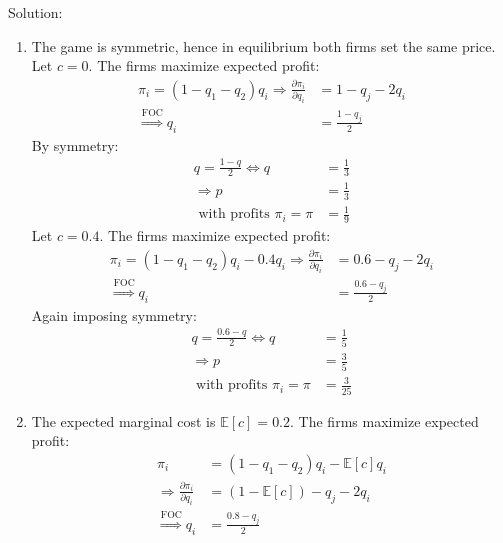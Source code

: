 \documentclass[11pt]{article}
\numberwithin{equation}{section}
\newcommand{\1}[1]{\,I_{#1}} %
\begin{document}
\begin{enumerate}
	      Solution:
	      \begin{enumerate}
		      \item The game is symmetric, hence in equilibrium both firms set the same
		            price. Let $c=0$. The firms maximize expected profit:
		            \begin{align*}
			            \pi_i=(1-q_1-q_2)q_i\Longrightarrow\frac{\partial\pi_i}{\partial q_i} & =1-q_j-2q_i      \\
			            \overset{\text{FOC}}{\Longrightarrow} q_i                             & =\frac{1-q_j}{2}
		            \end{align*}
		            By symmetry:
		            \begin{align*}
			            q=\frac{1-q}{2}\Longleftrightarrow q & =\frac{1}{3} \\
			            \Longrightarrow p                    & =\frac{1}{3} \\
			            \text{ with profits } \pi_i=\pi      & =\frac{1}{9}
		            \end{align*}
		            Let $c=0.4$. The firms maximize expected profit:
		            \begin{align*}
			            \pi_i=(1-q_1-q_2)q_i-0.4q_i\Longrightarrow\frac{\partial\pi_i}{\partial q_i} & =0.6-q_j-2q_i      \\
			            \overset{\text{FOC}}{\Longrightarrow}q_i                                     & =\frac{0.6-q_j}{2}
		            \end{align*}
		            Again imposing symmetry:
		            \begin{align*}
			            q=\frac{0.6-q}{2}\Longleftrightarrow q & =\frac{1}{5}  \\
			            \Longrightarrow p                      & =\frac{3}{5}  \\
			            \text{ with profits } \pi_i=\pi        & =\frac{3}{25}
		            \end{align*}
		      \item The expected marginal cost is $\mathbb{E}[c]=0.2$. The firms maximize
		            expected profit:
		            \begin{align*}
			            \pi_i                                             & =(1-q_1-q_2)q_i-\mathbb{E}[c]q_i \\
			            \Longrightarrow\frac{\partial\pi_i}{\partial q_i} & =(1-\mathbb{E}[c])-q_j-2q_i      \\
			            \overset{\text{FOC}}{\Longrightarrow}q_i          & =\frac{0.8-q_j}{2}

\end{align*}
\end{enumerate}
\end{enumerate}
\end{document}

